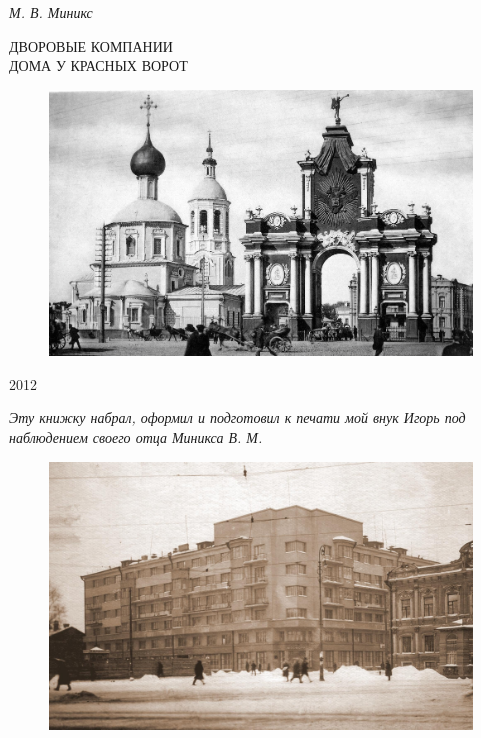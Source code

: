 
\thispagestyle{empty} 

\begin{center}

\vspace{35pt}

\textit{ \Large{ М. В. Миникс}}

\vfill

\large ДВОРОВЫЕ КОМПАНИИ \\ ДОМА У КРАСНЫХ ВОРОТ

\vfill

\begin{figure}[ht]
  \centering
  \includegraphics[width=\textwidth]{inc/1/1}
\end{figure}

\vfill

2012

\end{center}

\newpage

\thispagestyle{empty} 



\vspace*{70pt}

\noindent
\begin{center}
\begin{minipage}{65mm}
\textit{Эту книжку набрал, оформил и подготовил к печати мой внук Игорь  под наблюдением своего отца Миникса В. М.}
\end{minipage}
\end{center}

\vspace{49pt}

\begin{figure}[h!]
  \centering
  \includegraphics[width=\textwidth]{inc/2/1}
\end{figure}

\newpage
